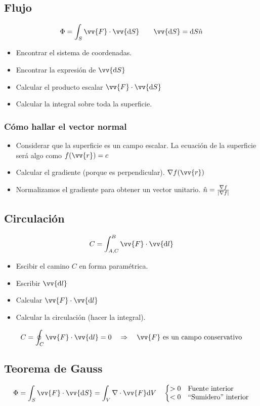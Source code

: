 \documentclass[a4paper, 8pt]{extarticle}
\renewcommand{\vec}[1]{\vv{{#1}}}
\renewcommand{\grad}{\nabla}
\begin{document}
\begin{multicols}{3}
  \subsection{Flujo}
  \[ \Phi = \int_{S} \vec{F} \cdot \vec{\dd S} \qquad \vec{\dd S} = \dd S \hat{n}\]
  \begin{itemize}
    \setlength\itemsep{0em}
    \item Encontrar el sistema de coordenadas.
    \item Encontrar la expresión de $\vec{\dd S}$
    \item Calcular el producto escalar $\vec{F} \cdot \vec{\dd S}$
    \item Calcular la integral sobre toda la superficie.
  \end{itemize}

  \subsubsection{Cómo hallar el vector normal}
  \begin{itemize}
    \setlength\itemsep{0em}
    \item Considerar que la superficie es un campo escalar. La ecuación de la superficie será algo como $f(\vec{r}) = c$
    \item Calcular el gradiente (porque es perpendicular). $\grad f(\vec{r})$
    \item Normalizamos el gradiente para obtener un vector unitario. $\hat{n} = \frac{\grad f}{\abs{\grad f}}$
  \end{itemize}

  \subsection{Circulación}
  \[ C = \int_{A,C}^{B} \vec{F} \cdot \vec{\dd l} \]
  \begin{itemize}
    \setlength\itemsep{0em}
    \item Escibir el camino $C$ en forma paramétrica.
    \item Escribir $\vec{\dd l}$
    \item Calcular $\vec{F} \cdot \vec{\dd l}$
    \item Calcular la circulación (hacer la integral).
  \end{itemize}
  \[ C = \oint _C \vec{F}\cdot \vec{\dd l} = 0 \quad \Rightarrow \quad \vec{F} \text{ es un campo conservativo} \]

  \subsection{Teorema de Gauss}
  \[ \Phi = \int_{S} \vec{F}\cdot \vec{\dd S} = \int_{V} \grad \cdot \vec{F} \dd V \quad \left\lbrace
    \begin{matrix*}[l]
      > 0 & \text{Fuente interior}\\
      < 0 & \text{``Sumidero'' interior}\\
    \end{matrix*} \right.\]


\end{multicols}
\end{document}
